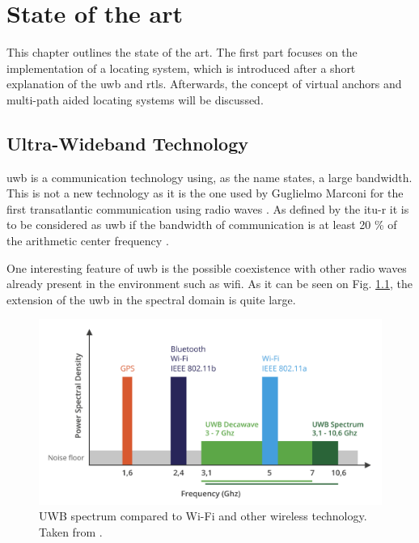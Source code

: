 % 			 
%
%

\chapter{State of the art}
\label{stateoftheart}

This chapter outlines the state of the art. The first part focuses on the implementation of a locating system, which is introduced after a short explanation of the \gls{uwb} and \gls{rtls}. Afterwards, the concept of virtual anchors and multi-path aided locating systems will be discussed.


\section{Ultra-Wideband Technology}
\label{uwb}
\gls{uwb} is a communication technology using, as the name states, a large bandwidth. This is not a new technology as it is the one used by Guglielmo Marconi for the first transatlantic communication using radio waves \cite{nekoogar2005uwb}. As defined by the \gls{itu-r} it is to be considered as \gls{uwb} if the bandwidth of communication is at least 20 \% of the arithmetic center frequency \cite{itur2006characteristics}.
\vspace{2mm}

One interesting feature of \gls{uwb} is the possible coexistence with other radio waves already present in the environment such as \gls{wifi}. As it can be seen on Fig. \ref{fig:UWB_Techonology}, the extension of the \gls{uwb} in the spectral domain is quite large. 

\begin{figure}[H]
\includegraphics[width=.6\linewidth]{Images/uwb_bandwidth.png}
\centering
\caption{UWB spectrum compared to Wi-Fi and other wireless technology. Taken from \cite{itur2006characteristics}.}
\label{fig:UWB_Techonology}
\end{figure} 

